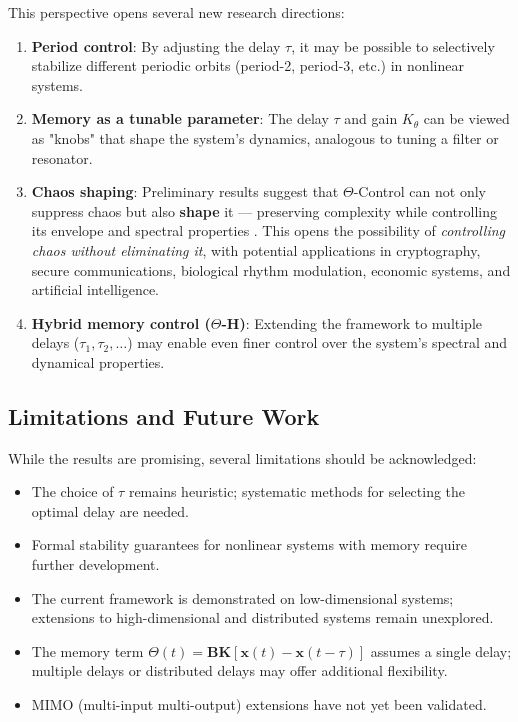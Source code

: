 \documentclass[12pt,a4paper]{article}
\begin{document}
This perspective opens several new research directions:

\begin{enumerate}
    \item \textbf{Period control}: By adjusting the delay $\tau$, 
    it may be possible to selectively stabilize different periodic 
    orbits (period-2, period-3, etc.) in nonlinear systems.
    
    \item \textbf{Memory as a tunable parameter}: The delay $\tau$ 
    and gain $K_\theta$ can be viewed as "knobs" that shape the 
    system's dynamics, analogous to tuning a filter or resonator.
    
    \item \textbf{Chaos shaping}: Preliminary results suggest that 
    $\Theta$-Control can not only suppress chaos but also 
    \textbf{shape} it — preserving complexity while controlling 
    its envelope and spectral properties \citep{Ott1990}. 
    This opens the possibility of \textit{controlling chaos 
    without eliminating it}, with potential applications in 
    cryptography, secure communications, biological rhythm 
    modulation, economic systems, and artificial intelligence.
    
    \item \textbf{Hybrid memory control ($\Theta$-H)}: Extending 
    the framework to multiple delays ($\tau_1, \tau_2, \ldots$) may 
    enable even finer control over the system's spectral and 
    dynamical properties.
\end{enumerate}

\subsection{Limitations and Future Work}

While the results are promising, several limitations should be 
acknowledged:

\begin{itemize}
    \item The choice of $\tau$ remains heuristic; systematic 
    methods for selecting the optimal delay are needed.
    
    \item Formal stability guarantees for nonlinear systems with 
    memory require further development.
    
    \item The current framework is demonstrated on low-dimensional 
    systems; extensions to high-dimensional and distributed 
    systems remain unexplored.
    
    \item The memory term $\Theta(t) = \mathbf{BK}[\mathbf{x}(t) - 
    \mathbf{x}(t-\tau)]$ assumes a single delay; multiple delays 
    or distributed delays may offer additional flexibility.
    
    \item MIMO (multi-input multi-output) extensions have not yet 
    been validated.
\end{itemize}
\end{document}
